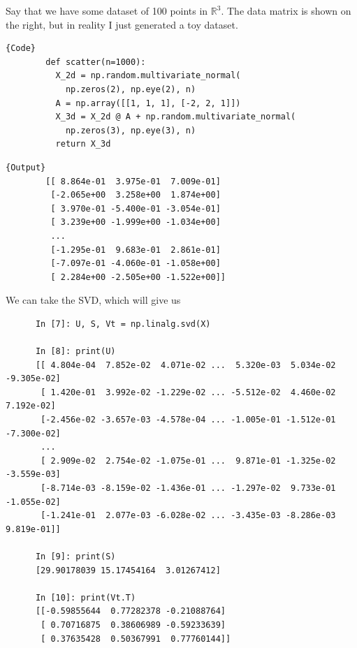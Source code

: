   \begin{example}[Walkthrough]
    \label{ex:walkthrough}
    Say that we have some dataset of 100 points in $\mathbb{R}^3$. The data matrix is shown on the right, but in reality I just generated a toy dataset. 

    \noindent\begin{minipage}{.5\textwidth}
      \begin{lstlisting}[]{Code}
        def scatter(n=1000): 
          X_2d = np.random.multivariate_normal(
            np.zeros(2), np.eye(2), n) 
          A = np.array([[1, 1, 1], [-2, 2, 1]])
          X_3d = X_2d @ A + np.random.multivariate_normal(
            np.zeros(3), np.eye(3), n)
          return X_3d
      \end{lstlisting}
      \end{minipage}
      \hfill
      \begin{minipage}{.49\textwidth}
      \begin{lstlisting}[]{Output}
        [[ 8.864e-01  3.975e-01  7.009e-01]
         [-2.065e+00  3.258e+00  1.874e+00]
         [ 3.970e-01 -5.400e-01 -3.054e-01]
         [ 3.239e+00 -1.999e+00 -1.034e+00]
         ...
         [-1.295e-01  9.683e-01  2.861e-01]
         [-7.097e-01 -4.060e-01 -1.058e+00]
         [ 2.284e+00 -2.505e+00 -1.522e+00]]
      \end{lstlisting}
    \end{minipage}

    We can take the SVD, which will give us

    \begin{lstlisting}
      In [7]: U, S, Vt = np.linalg.svd(X)

      In [8]: print(U)
      [[ 4.804e-04  7.852e-02  4.071e-02 ...  5.320e-03  5.034e-02 -9.305e-02]
       [ 1.420e-01  3.992e-02 -1.229e-02 ... -5.512e-02  4.460e-02  7.192e-02]
       [-2.456e-02 -3.657e-03 -4.578e-04 ... -1.005e-01 -1.512e-01 -7.300e-02]
       ...
       [ 2.909e-02  2.754e-02 -1.075e-01 ...  9.871e-01 -1.325e-02 -3.559e-03]
       [-8.714e-03 -8.159e-02 -1.436e-01 ... -1.297e-02  9.733e-01 -1.055e-02]
       [-1.241e-01  2.077e-03 -6.028e-02 ... -3.435e-03 -8.286e-03  9.819e-01]]

      In [9]: print(S)
      [29.90178039 15.17454164  3.01267412]

      In [10]: print(Vt.T)
      [[-0.59855644  0.77282378 -0.21088764]
       [ 0.70716875  0.38606989 -0.59233639]
       [ 0.37635428  0.50367991  0.77760144]] 
    \end{lstlisting} 


\end{example}
